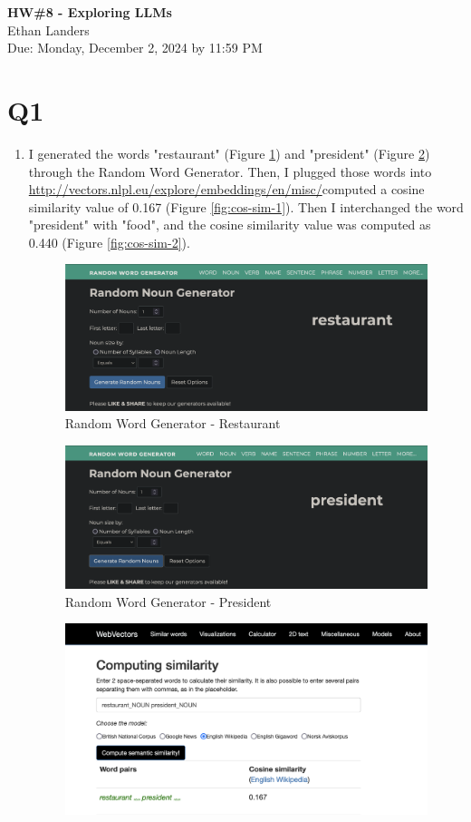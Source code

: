 \documentclass[12pt]{article}
\begin{document}
\begin{centering}
{\large\textbf{HW\#8 - Exploring LLMs}}\\ 
Ethan Landers\\
Due: Monday, December 2, 2024 by 11:59 PM\\
\end{centering}


\section*{Q1}

\begin{enumerate}
    
    \item I generated the words "restaurant" (Figure \ref{fig:restaurant}) and "president" (Figure \ref{fig:president}) through the Random Word Generator. Then, I plugged those words into \url{http://vectors.nlpl.eu/explore/embeddings/en/misc/}computed a cosine similarity value of 0.167 (Figure \ref{fig:cos-sim-1}). Then I interchanged the word "president" with "food", and the cosine similarity value was computed as 0.440 (Figure \ref{fig:cos-sim-2}).
    \begin{figure}
        \centering
        \includegraphics[width=0.5\linewidth]{Q1-1-1.png}
        \caption{Random Word Generator - Restaurant}
        \label{fig:restaurant}
    \end{figure}
    \begin{figure}
        \centering
        \includegraphics[width=0.5\linewidth]{Q1-1-2.png}
        \caption{Random Word Generator - President}
        \label{fig:president}
    \end{figure}
    \begin{figure}
        \centering
        \includegraphics[width=0.5\linewidth]{Q1-1-3.png}

\end{figure}
\end{enumerate}
\end{document}
